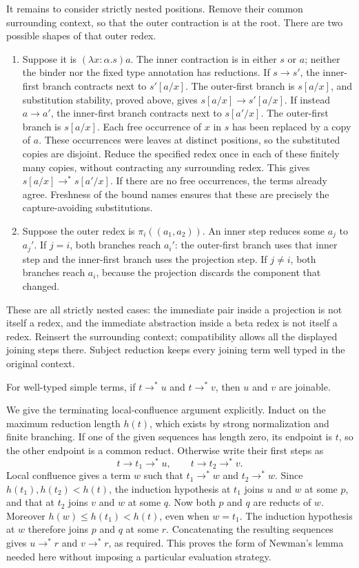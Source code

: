 It remains to consider strictly nested positions. Remove their common
surrounding context, so that the outer contraction is at the root.
There are two possible shapes of that outer redex.
\begin{enumerate}
\item Suppose it is $(\lambda x:\alpha.s)a$. The inner contraction is
in either $s$ or $a$; neither the binder nor the fixed type annotation
has reductions. If $s\to s'$, the inner-first branch contracts next to
$s'[a/x]$. The outer-first branch is $s[a/x]$, and substitution stability,
proved above, gives $s[a/x]\to s'[a/x]$.
If instead $a\to a'$, the inner-first branch contracts next to
$s[a'/x]$. The outer-first branch is $s[a/x]$. Each free occurrence of
$x$ in $s$ has been replaced by a copy of $a$. These occurrences were
leaves at distinct positions, so the substituted copies are disjoint.
Reduce the specified redex once in each of these finitely many copies,
without contracting any surrounding redex. This gives
$s[a/x]\to^*s[a'/x]$. If there are no free occurrences, the terms already
agree. Freshness of the bound names ensures that these are precisely the
capture-avoiding substitutions.
\item Suppose the outer redex is $\pi_i((a_1,a_2))$. An inner step
reduces some $a_j$ to $a_j'$. If $j=i$, both branches reach $a_i'$:
the outer-first branch uses that inner step and the inner-first branch
uses the projection step. If $j\ne i$, both branches reach $a_i$,
because the projection discards the component that changed.
\end{enumerate}
These are all strictly nested cases: the immediate pair inside a
projection is not itself a redex, and the immediate abstraction inside
a beta redex is not itself a redex. Reinsert the surrounding context;
compatibility allows all the displayed joining steps there. Subject
reduction keeps every joining term well typed in the original context.
\Done

\begin{theorem}[Confluence]
For well-typed simple terms, if $t\to^*u$ and $t\to^*v$, then $u$ and
$v$ are joinable.
\end{theorem}
\Proof
We give the terminating local-confluence argument explicitly. Induct on
the maximum reduction length $h(t)$, which exists by strong normalization
and finite branching. If one of the given sequences has length zero,
its endpoint is $t$, so the other endpoint is a common reduct. Otherwise
write their first steps as
\[
t\to t_1\to^*u,\qquad t\to t_2\to^*v.
\]
Local confluence gives a term $w$ such that
$t_1\to^*w$ and $t_2\to^*w$. Since $h(t_1),h(t_2)<h(t)$, the induction
hypothesis at $t_1$ joins $u$ and $w$ at some $p$, and that at $t_2$
joins $v$ and $w$ at some $q$. Now both $p$ and $q$ are reducts of $w$.
Moreover $h(w)\le h(t_1)<h(t)$, even when $w=t_1$. The induction
hypothesis at $w$ therefore joins $p$ and $q$ at some $r$. Concatenating
the resulting sequences gives $u\to^*r$ and $v\to^*r$, as required.
This proves the form of Newman's lemma needed here without imposing a
particular evaluation strategy.
\Done

